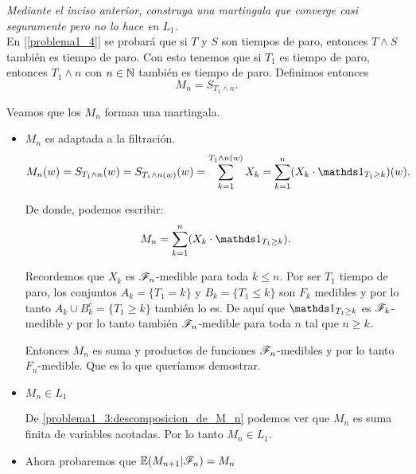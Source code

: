 \emph
{	
	Mediante el inciso anterior, construya una martingala que converge 
	casi seguramente pero no lo hace en $L_1$.\\
}
\afterstatement	
	En [\ref{problema1_4}] se probará que si $T$ y $S$ son tiempos de paro, entonces $T\wedge S$ también 
	es tiempo de paro. Con esto tenemos que si $T_1$ es tiempo de paro, entonces $T_1 \wedge n$ con 
	$n \in \mathbb{N}$ también es tiempo de paro. Definimos entonces 
	$$M_n = S_{T_1 \wedge n}.$$
	
	Veamos que los $M_n$ forman una martingala.
	
	\begin{itemize}
		\item 
			$M_n$ es adaptada a la filtración.
			\begin{align}
				M_n(w) = S_{T_1 \wedge n}(w) = 
				S_{T_1 \wedge n (w)}(w) = 
				\sum_{k=1}^{T_1 \wedge n (w)} X_k = 
				\sum_{k=1}^{n} (X_k \cdot \indic_{T_1 \geq k})(w).
			\end{align}
			
			De donde, podemos escribir:
			\begin{align}\label{problema1_3:descomposicion_de_M_n}
				M_n = \sum_{k=1}^{n} (X_k \cdot \indic_{T_1 \geq k}).
			\end{align}\par\null							 		
			
			Recordemos que $X_k$ es $\mathscr{F}_n$-medible para toda $k \leq n $. Por ser
			$T_1$ tiempo de paro, los conjuntos $A_k = \{T_1 = k\}$ y 
			$B_k = \{T_1 \leq k\}$	son $F_k$ medibles y por lo tanto 
			$A_k \cup B_k^c = \{ T_1 \geq k\}$ también lo es. De aquí que 
			$\indic_{T_1 \geq k}$ es $\mathscr{F}_k$-medible y por lo tanto también $\mathscr{F}_n$-medible
			para toda $n$ tal que $n \geq k$.\par\null
			  
			Entonces $M_n$ es suma y productos de funciones $\mathscr{F}_n$-medibles y por lo tanto
			$F_n$-medible. Que es lo que queríamos demostrar.\par\null
			
		\item
			$M_n \in L_1$\par\null
			
			De \eqref{problema1_3:descomposicion_de_M_n} podemos ver que $M_n$ es 
			suma finita de variables acotadas. Por lo tanto $M_n \in L_1$.\par\null
			
		\item Ahora probaremos que	$\mathbb{E}(M_{n+1} | \mathscr{F}_{n}) = M_{n}$\par\null
			

\end{itemize}
